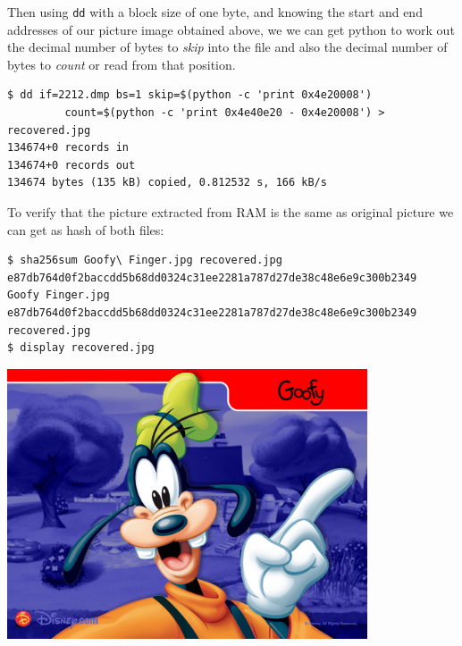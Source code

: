 \documentclass[a4paper,
    11pt,
    normalheadings,
    parindent,
    UKenglish,
    abstracton,
    ]{scrartcl}
\begin{document}
Then using \texttt{dd} with a block size of one byte, and knowing the start and end addresses of our picture image obtained above,  we we can get python to work out the decimal number of bytes to \emph{skip} into the file and also the decimal number of bytes to \emph{count} or read from that position.

\begin{verbatim}
$ dd if=2212.dmp bs=1 skip=$(python -c 'print 0x4e20008')
         count=$(python -c 'print 0x4e40e20 - 0x4e20008') > recovered.jpg
134674+0 records in
134674+0 records out
134674 bytes (135 kB) copied, 0.812532 s, 166 kB/s
\end{verbatim}

To verify that the picture extracted from RAM is the same as original picture we can get as hash of both files:
\begin{verbatim}
$ sha256sum Goofy\ Finger.jpg recovered.jpg
e87db764d0f2baccdd5b68dd0324c31ee2281a787d27de38c48e6e9c300b2349  Goofy Finger.jpg
e87db764d0f2baccdd5b68dd0324c31ee2281a787d27de38c48e6e9c300b2349  recovered.jpg
$ display recovered.jpg
\end{verbatim}
\begin{center} \includegraphics[width=0.8\textwidth]{bin/goofy} \end{center}
\end{document}
